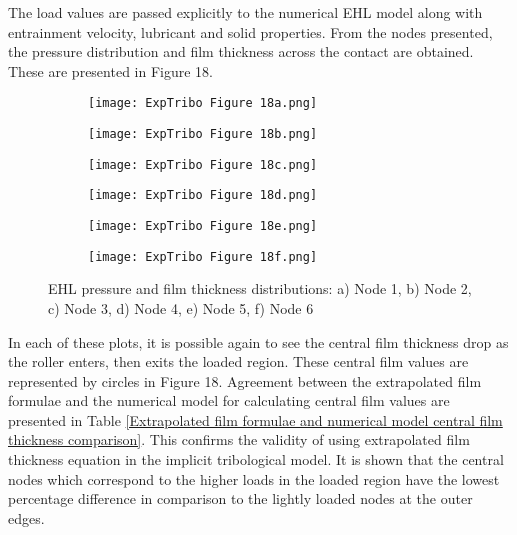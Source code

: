 The load values are passed explicitly to the numerical EHL model along with entrainment velocity, lubricant and solid properties. From the nodes presented, the pressure distribution and film thickness across the contact are obtained. These are presented in Figure 18.

\begin{figure}
	\centering
	\begin{subfigure}[b]{0.49\textwidth}
		\centering
		\texttt{[image: ExpTribo Figure 18a.png]}
		\caption{}
		\label{NodeA}
	\end{subfigure}
	\hfill
	\begin{subfigure}[b]{0.49\textwidth}
		\centering
		\texttt{[image: ExpTribo Figure 18b.png]}
		\caption{}
		\label{NodeB}
	\end{subfigure}
	\hfill
	\begin{subfigure}[b]{0.49\textwidth}
		\centering
		\texttt{[image: ExpTribo Figure 18c.png]}
		\caption{}
		\label{NodeC}
	\end{subfigure}
	\hfill
	\begin{subfigure}[b]{0.49\textwidth}
		\centering
		\texttt{[image: ExpTribo Figure 18d.png]}
		\caption{}
		\label{NodeD}
	\end{subfigure}
	\hfill
	\begin{subfigure}[b]{0.49\textwidth}
		\centering
		\texttt{[image: ExpTribo Figure 18e.png]}
		\caption{}
		\label{NodeE}
	\end{subfigure}
	\hfill
	\begin{subfigure}[b]{0.49\textwidth}
		\centering
		\texttt{[image: ExpTribo Figure 18f.png]}
		\caption{}
		\label{NodeF}
	\end{subfigure}
	\caption{EHL pressure and film thickness distributions: a) Node 1, b) Node 2, c) Node 3, d) Node 4, e) Node 5, f) Node 6}
	\label{EHL pressure and film thickness distributions}
\end{figure}

In each of these plots, it is possible again to see the central film thickness drop as the roller enters, then exits the loaded region. These central film values are represented by circles in Figure 18. Agreement between the extrapolated film formulae and the numerical model for calculating central film values are presented in Table \ref{Extrapolated film formulae and numerical model central film thickness comparison}. This confirms the validity of using extrapolated film thickness equation in the implicit tribological model. It is shown that the central nodes which correspond to the higher loads in the loaded region have the lowest percentage difference in comparison to the lightly loaded nodes at the outer edges.

